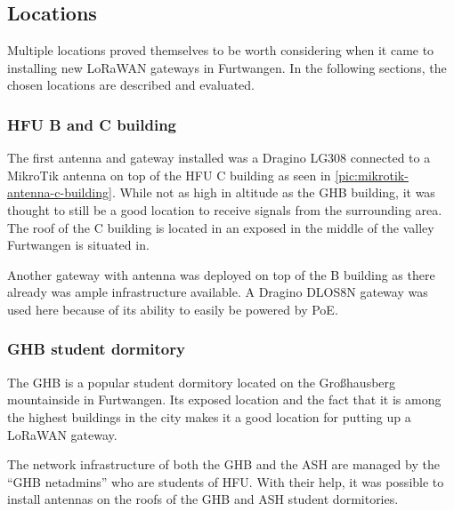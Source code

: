 \subsection{Locations}


Multiple locations proved themselves to be worth considering when it came to installing new \ac{LoRaWAN} gateways in Furtwangen.
In the following sections, the chosen locations are described and evaluated.

\subsubsection{\ac{HFU} B and C building}


The first antenna and gateway installed was a Dragino LG308 connected to a MikroTik antenna on top of the \ac{HFU} C building as seen in \cref{pic:mikrotik-antenna-c-building}.
While not as high in altitude as the \ac{GHB} building, it was thought to still be a good location to receive signals from the surrounding area.
The roof of the C building is located in an exposed in the middle of the valley Furtwangen is situated in.

Another gateway with antenna was deployed on top of the B building as there already was ample infrastructure available.
A Dragino DLOS8N gateway was used here because of its ability to easily be powered by \ac{PoE}.

\subsubsection{\acf{GHB} student dormitory}

The \ac{GHB} is a popular student dormitory located on the Großhausberg mountainside in Furtwangen.
Its exposed location and the fact that it is among the highest buildings in the city makes it a good location for putting up a \ac{LoRaWAN} gateway.

The network infrastructure of both the \ac{GHB} and the \ac{ASH} are managed by the ``\ac{GHB} netadmins'' who are students of \ac{HFU}.
With their help, it was possible to install antennas on the roofs of the \ac{GHB} and \ac{ASH} student dormitories.

